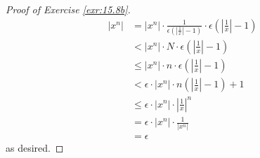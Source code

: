 \documentclass[../main.tex]{subfiles}
\begin{document}
\begin{exercise}
\begin{enumerate}[label={(\alph*)},ref={\theexercise\alph*}]
\begin{proof}[Proof of Exercise \ref{exr:15.8b}]
            \begingroup
            \allowdisplaybreaks
            \begin{align*}
                |x^n| &= |x^n|\cdot\frac{1}{\epsilon\left( \left| \frac{1}{x} \right|-1 \right)}\cdot\epsilon\left( \left| \frac{1}{x} \right|-1 \right)\\
                &< |x^n|\cdot N\cdot\epsilon\left( \left| \frac{1}{x} \right|-1 \right)\\
                &\leq |x^n|\cdot n\cdot\epsilon\left( \left| \frac{1}{x} \right|-1 \right)\\
                &< \epsilon\cdot|x^n|\cdot n\left( \left| \frac{1}{x} \right|-1 \right)+1\\
                &\leq \epsilon\cdot|x^n|\cdot\left| \frac{1}{x} \right|^n\tag*{The Lemma}\\
                &= \epsilon\cdot|x^n|\cdot\frac{1}{|x^n|}\\
                &= \epsilon
            \end{align*}
            \endgroup
            as desired.
        \end{proof}
    \end{enumerate}
\end{exercise}
\end{document}
